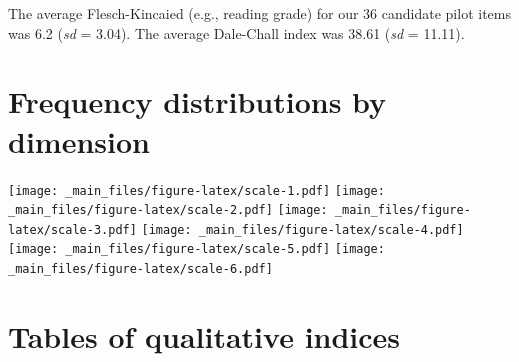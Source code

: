 \documentclass[
]{book}
\begin{document}
The average Flesch-Kincaied (e.g., reading grade) for our 36 candidate pilot items was 6.2 (\emph{sd} = 3.04). The average Dale-Chall index was 38.61 (\emph{sd} = 11.11).

\hypertarget{frequency-distributions-by-dimension}{%
\section{Frequency distributions by dimension}\label{frequency-distributions-by-dimension}}

\texttt{[image: \_main\_files/figure-latex/scale-1.pdf]} \texttt{[image: \_main\_files/figure-latex/scale-2.pdf]} \texttt{[image: \_main\_files/figure-latex/scale-3.pdf]} \texttt{[image: \_main\_files/figure-latex/scale-4.pdf]} \texttt{[image: \_main\_files/figure-latex/scale-5.pdf]} \texttt{[image: \_main\_files/figure-latex/scale-6.pdf]}

\hypertarget{tables-of-qualitative-indices}{%
\section{Tables of qualitative indices}\label{tables-of-qualitative-indices}}
\end{document}
